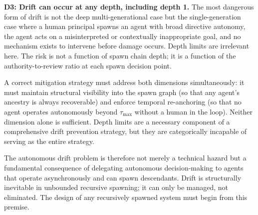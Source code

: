 \textbf{D3: Drift can occur at any depth, including depth 1.} The most dangerous form of drift is not the deep multi-generational case but the single-generation case where a human principal spawns an agent with broad directive autonomy, the agent acts on a misinterpreted or contextually inappropriate goal, and no mechanism exists to intervene before damage occurs. Depth limits are irrelevant here. The risk is not a function of spawn chain depth; it is a function of the authority-to-review ratio at each spawn decision point.

A correct mitigation strategy must address both dimensions simultaneously: it must maintain structural visibility into the spawn graph (so that any agent's ancestry is always recoverable) and enforce temporal re-anchoring (so that no agent operates autonomously beyond $\tau_{\text{max}}$ without a human in the loop). Neither dimension alone is sufficient. Depth limits are a necessary component of a comprehensive drift prevention strategy, but they are categorically incapable of serving as the entire strategy.

The autonomous drift problem is therefore not merely a technical hazard but a fundamental consequence of delegating autonomous decision-making to agents that operate asynchronously and can spawn descendants. Drift is structurally inevitable in unbounded recursive spawning; it can only be managed, not eliminated. The design of any recursively spawned system must begin from this premise.